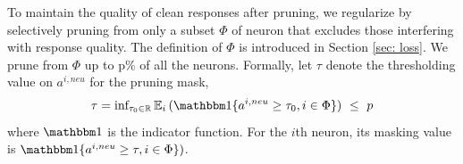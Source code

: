To maintain the quality of clean responses after pruning, 
we regularize by selectively pruning from only a subset $\Phi$ of neuron that excludes those interfering with response quality. The definition of $\Phi$ is introduced in Section \ref{sec: loss}.
We prune from $\Phi$ up to p$\%$ of all the neurons.
Formally, let $\tau$ denote the thresholding value on  $a^{i,neu}$ for the pruning mask,
%
\begin{equation} \label{eq: tao}
    \tau = \text{inf}_{\tau_0\in\mathbb R} \, \mathbb E_i\, ( \mathbbm 1\{a^{i,neu}\geq\tau_0, i\in\Phi\} )\ \leq \,\, p
\end{equation}
%
where $ \mathbbm 1$ is the indicator function. For the $i$th neuron, its masking value is $\mathbbm 1\{a^{i,neu}\geq\tau, i\in\Phi\} )$.





